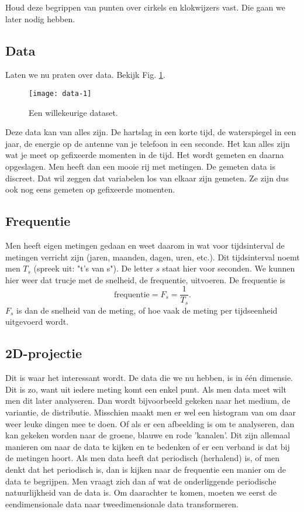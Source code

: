 \documentclass[11pt,fleqn]{book} %
\begin{document}
Houd deze begrippen van punten over cirkels en klokwijzers vast. Die gaan we later nodig hebben.

\subsection{Data}
Laten we nu praten over data. Bekijk Fig. \ref{fig:data-1}. 
\begin{figure}[h]
	\centering\texttt{[image: data-1]}
	\caption{Een willekeurige dataset.}
	\label{fig:data-1}
\end{figure}

Deze data kan van alles zijn. De hartslag in een korte tijd, de waterspiegel in een jaar, de energie op de antenne van je telefoon in een seconde. Het kan alles zijn wat je meet op gefixeerde momenten in de tijd. Het wordt gemeten en daarna opgeslagen. Men heeft dan een mooie rij met metingen. De gemeten data is discreet. Dat wil zeggen dat variabelen los van elkaar zijn gemeten. Ze zijn dus ook nog eens gemeten op gefixeerde momenten.

\subsection{Frequentie}
Men heeft eigen metingen gedaan en weet daarom in wat voor tijdsinterval de metingen verricht zijn (jaren, maanden, dagen, uren, etc.). Dit tijdsinterval noemt men $T_s$ (spreek uit: "t's van s"). De letter $s$ staat hier voor seconden. We kunnen hier weer dat trucje met de snelheid, de frequentie, uitvoeren. De frequentie is
\begin{displaymath}
	\text{frequentie}=F_s=\frac{1}{T_s}.
\end{displaymath}
$F_s$ is dan de snelheid van de meting, of hoe vaak de meting per tijdseenheid uitgevoerd wordt.

\subsection{2D-projectie}
Dit is waar het interessant wordt. De data die we nu hebben, is in één dimensie. Dit is zo, want uit iedere meting komt een enkel punt. Als men data meet wilt men dit later analyseren. Dan wordt bijvoorbeeld gekeken naar het medium, de variantie, de distributie. Misschien maakt men er wel een histogram van om daar weer leuke dingen mee te doen. Of als er een afbeelding is om te analyseren, dan kan gekeken worden naar de groene, blauwe en rode 'kanalen'. Dit zijn allemaal manieren om naar de data te kijken en te bedenken of er een verband is dat bij de metingen hoort. Als men data heeft dat periodisch (herhalend) is, of men denkt dat het periodisch is, dan is kijken naar de frequentie een manier om de data te begrijpen. Men vraagt zich dan af wat de onderliggende periodische natuurlijkheid van de data is. Om daarachter te komen, moeten we eerst de eendimensionale data naar tweedimensionale data transformeren.
\end{document}
